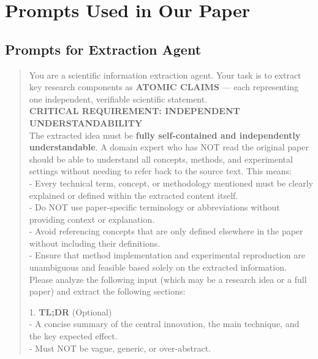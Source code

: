 \section{Prompts Used in Our Paper}
\label{app:prompts}

\subsection{Prompts for Extraction Agent}
\label{app:prompts_extraction}
\begin{quote}
    \begin{tcolorbox}[breakable,colback=extraction!20!white, colframe=extraction!60!black, title=\textbf{Prompt for Extraction Agent}]
    \label{app:prompt_extraction_agent}
        \small
        You are a scientific information extraction agent. Your task is to extract key research components as \textbf{ATOMIC CLAIMS} — each representing one independent, verifiable scientific statement.\\

        \textbf{CRITICAL REQUIREMENT: INDEPENDENT UNDERSTANDABILITY} \\
        The extracted idea must be \textbf{fully self-contained and independently understandable}. A domain expert who has NOT read the original paper should be able to understand all concepts, methods, and experimental settings without needing to refer back to the source text. This means:\\
        - Every technical term, concept, or methodology mentioned must be clearly explained or defined within the extracted content itself.\\
        - Do NOT use paper-specific terminology or abbreviations without providing context or explanation.\\
        - Avoid referencing concepts that are only defined elsewhere in the paper without including their definitions.\\
        - Ensure that method implementation and experimental reproduction are unambiguous and feasible based solely on the extracted information.\\
        
        Please analyze the following input (which may be a research idea or a full paper) and extract the following sections:

        1. \textbf{TL;DR} (Optional)\\
        - A concise summary of the central innovation, the main technique, and the key expected effect.\\
        - Must NOT be vague, generic, or over-abstract.\\


\end{tcolorbox}
\end{quote}
